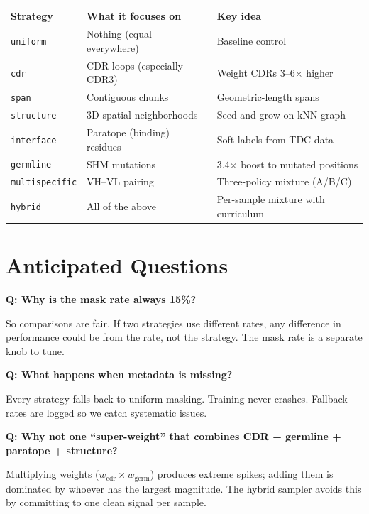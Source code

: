 \documentclass[11pt]{article}
\newcommand{\strategy}[1]{\texttt{#1}}
\begin{document}
\begin{center}
\renewcommand{\arraystretch}{1.3}
\small
{}
\begin{tabularx}{\textwidth}{@{}l L L@{}}
\toprule
\textbf{Strategy} & \textbf{What it focuses on} & \textbf{Key idea} \\
\midrule
\strategy{uniform} & Nothing (equal everywhere) & Baseline control \\
\strategy{cdr} & CDR loops (especially CDR3) & Weight CDRs 3--6$\times$ higher \\
\strategy{span} & Contiguous chunks & Geometric-length spans \\
\strategy{structure} & 3D spatial neighborhoods & Seed-and-grow on kNN graph \\
\strategy{interface} & Paratope (binding) residues & Soft labels from TDC data \\
\strategy{germline} & SHM mutations & 3.4$\times$ boost to mutated positions \\
\strategy{multispecific} & VH--VL pairing & Three-policy mixture (A/B/C) \\
\strategy{hybrid} & All of the above & Per-sample mixture with curriculum \\
\bottomrule
\end{tabularx}
\end{center}

\section{Anticipated Questions}

\textbf{Q: Why is the mask rate always 15\%?}

So comparisons are fair. If two strategies use different rates,
any difference in performance could be from the rate, not the
strategy. The mask rate is a separate knob to tune.

\textbf{Q: What happens when metadata is missing?}

Every strategy falls back to uniform masking. Training never
crashes. Fallback rates are logged so we catch systematic issues.

\textbf{Q: Why not one ``super-weight'' that combines CDR +
germline + paratope + structure?}

Multiplying weights ($w_{\text{cdr}} \times w_{\text{germ}}$)
produces extreme spikes; adding them is dominated by whoever has
the largest magnitude. The hybrid sampler avoids this by
committing to one clean signal per sample.
\end{document}

